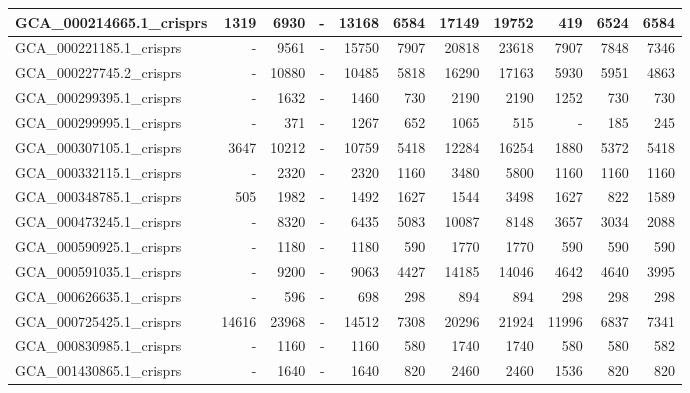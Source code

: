 \documentclass[12pt,a4paper]{article}
\begin{document}
\begin{table}[ht]
\begin{center}
\begin{tabular}{|l*{10}{|r}|}
GCA\_000214665.1\_crisprs & 1319 & 6930 & - & 13168 & 6584 & 17149 & 19752 & 419 & 6524 & 6584 \\ \hline
GCA\_000221185.1\_crisprs & - & 9561 & - & 15750 & 7907 & 20818 & 23618 & 7907 & 7848 & 7346 \\ \hline
GCA\_000227745.2\_crisprs & - & 10880 & - & 10485 & 5818 & 16290 & 17163 & 5930 & 5951 & 4863 \\ \hline
GCA\_000299395.1\_crisprs & - & 1632 & - & 1460 & 730 & 2190 & 2190 & 1252 & 730 & 730 \\ \hline
GCA\_000299995.1\_crisprs & - & 371 & - & 1267 & 652 & 1065 & 515 & - & 185 & 245 \\ \hline
GCA\_000307105.1\_crisprs & 3647 & 10212 & - & 10759 & 5418 & 12284 & 16254 & 1880 & 5372 & 5418 \\ \hline
GCA\_000332115.1\_crisprs & - & 2320 & - & 2320 & 1160 & 3480 & 5800 & 1160 & 1160 & 1160 \\ \hline
GCA\_000348785.1\_crisprs & 505 & 1982 & - & 1492 & 1627 & 1544 & 3498 & 1627 & 822 & 1589 \\ \hline
GCA\_000473245.1\_crisprs & - & 8320 & - & 6435 & 5083 & 10087 & 8148 & 3657 & 3034 & 2088 \\ \hline
GCA\_000590925.1\_crisprs & - & 1180 & - & 1180 & 590 & 1770 & 1770 & 590 & 590 & 590 \\ \hline
GCA\_000591035.1\_crisprs & - & 9200 & - & 9063 & 4427 & 14185 & 14046 & 4642 & 4640 & 3995 \\ \hline
GCA\_000626635.1\_crisprs & - & 596 & - & 698 & 298 & 894 & 894 & 298 & 298 & 298 \\ \hline
GCA\_000725425.1\_crisprs & 14616 & 23968 & - & 14512 & 7308 & 20296 & 21924 & 11996 & 6837 & 7341 \\ \hline
GCA\_000830985.1\_crisprs & - & 1160 & - & 1160 & 580 & 1740 & 1740 & 580 & 580 & 582 \\ \hline
GCA\_001430865.1\_crisprs & - & 1640 & - & 1640 & 820 & 2460 & 2460 & 1536 & 820 & 820 \\ \hline
\end{tabular}
\end{center}
\end{table}
\end{document}
